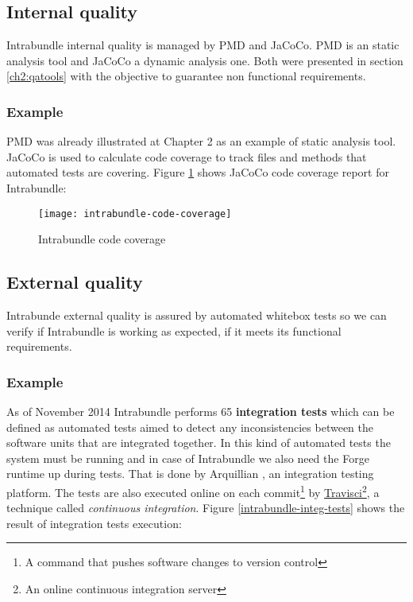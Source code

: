 \subsection{Internal quality}
Intrabundle internal quality is managed by PMD and JaCoCo. PMD is an static analysis tool and JaCoCo a dynamic analysis one. Both were presented in section \ref{ch2:qatools} with the objective to guarantee non functional requirements.

\subsubsection{Example}
 PMD was already illustrated at Chapter 2 as an example of static analysis tool. JaCoCo is used to calculate code coverage to track files and methods that automated tests are covering. Figure \ref{intrabundle-code-cover} shows JaCoCo code coverage report for Intrabundle:

\begin{figure}[h]
\caption{Intrabundle code coverage}
\label{intrabundle-code-cover}
\texttt{[image: intrabundle-code-coverage]}
\end{figure}

\FloatBarrier
\newpage
\subsection{External quality}
Intrabunde external quality is assured by automated whitebox tests so we can verify if Intrabundle is working as expected, if it meets its functional requirements.

\subsubsection{Example}
As of November 2014 Intrabundle performs 65 \textbf{integration tests} which can be defined as automated tests aimed to detect any inconsistencies between the software units that are integrated together. In this kind of automated tests the system must be running and in case of Intrabundle we also need the Forge runtime up during tests. That is done by Arquillian \citep{dan 2011}, an integration testing platform. The tests are also executed online on each commit\footnote{A command that pushes software changes to version control} by \href{https://travis-ci.org/rmpestano/intrabundle}{Travisci}\footnote{An online continuous integration server}, a technique called \emph{continuous integration}. Figure \ref{intrabundle-integ-tests} shows the result of integration tests execution:

